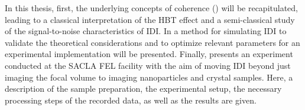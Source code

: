 In this thesis, first, the underlying concepts of coherence () will be recapitulated, leading to a classical interpretation of the HBT effect and a semi-classical study of the signal-to-noise characteristics of IDI. In  a method for simulating IDI to validate the theoretical considerations and to optimize relevant parameters for an experimental implementation will be presented.   Finally,  presents an experiment conducted at the SACLA FEL facility with the aim of moving IDI beyond just imaging the focal volume to imaging nanoparticles and crystal samples. Here, a description of the sample preparation, the experimental setup, the necessary processing steps of the recorded data, as well as the results are given.

